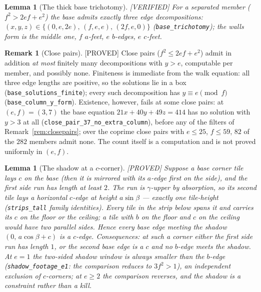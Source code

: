 \documentclass[11pt,reqno]{amsart}
\theoremstyle{plain}
\newtheorem{lemma}[theorem]{Lemma}
\theoremstyle{definition}
\newtheorem{remark}[theorem]{Remark}
\newcommand{\lab}[1]{\hfill\textnormal{\footnotesize\textsc{[#1]}}}
\begin{document}
\begin{lemma}[The thick base trichotomy]\label{lem:basetri}\lab{VERIFIED}
For a separated member ($f^2>2ef+e^2$) the base admits exactly three edge decompositions:
$(x,y,z)\in\{(0,e,2e),\,(f,e,e),\,(2f,e,0)\}$ (\texttt{base\_trichotomy}); the walls form is the
middle one, $f$ $a$-feet, $e$ $b$-edges, $e$ $c$-feet.
\end{lemma}

\begin{remark}[Close pairs]\label{rem:closepairbase}\lab{PROVED}
Close pairs ($f^2\le2ef+e^2$) admit in addition \emph{at most} finitely many decompositions with
$y>e$, computable per member, and possibly none. Finiteness is immediate from the walk equation:
all three edge lengths are positive, so the solutions lie in a box
(\texttt{base\_solutions\_finite}); every such decomposition has $y\equiv e\pmod f$
(\texttt{base\_column\_y\_form}). Existence, however, fails at some close pairs: at $(e,f)=(3,7)$
the base equation $21x+40y+49z=414$ has no solution with $y>3$ at all
(\texttt{close\_pair\_37\_no\_extra\_column}), before any of the filters of
Remark~\ref{rem:closepairs}; over the coprime close pairs with $e\le25$, $f\le59$, $82$ of the $282$
members admit none. The count itself is a computation and is not proved uniformly in $(e,f)$.
\end{remark}

\begin{lemma}[The shadow at a $c$-corner]\label{lem:shadow}\lab{PROVED}
Suppose a base corner tile lays $c$ on the base (then it is mirrored with its $a$-edge first on
the side), and the first side run has length at least $2$. The run is $\gamma$-upper by
absorption, so its second tile lays a horizontal $c$-edge at height $a\sin\beta$ --- exactly one
tile-height (\texttt{strips\_tall} family identities). Every tile in the strip below spans it and
carries its $c$ on the floor or the ceiling; a tile with $b$ on the floor and $c$ on the ceiling
would have two parallel sides. Hence every base edge meeting the shadow $(0,\,a\cos\beta+c)$ is a
$c$-edge. Consequences: at such a corner either the first side run has length $1$, or the second
base edge is a $c$ and no $b$-edge meets the shadow. At $e=1$ the two-sided shadow window is
always smaller than the $b$-edge (\texttt{shadow\_footage\_e1}: the comparison reduces to
$3f^2>1$), an independent exclusion of $c$-corners; at $e\ge2$ the comparison reverses, and the
shadow is a constraint rather than a kill.
\end{lemma}
\end{document}
